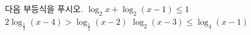 다음 부등식을 푸시오.
 $\log_2 x+\log_2 (x-1)\le 1$
 $2\log_{\frac{1}{2}} (x-4)>\log_{\frac{1}{2}} (x-2)$
 $\log_2 (x-3)\le\log_4 (x-1)$
